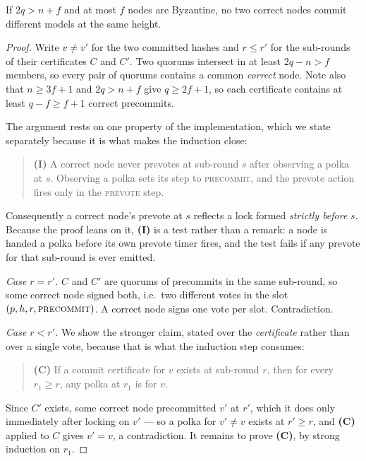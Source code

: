 \documentclass{llncs}
\begin{document}
\begin{proposition}[Agreement]
If $2q > n+f$ and at most $f$ nodes are Byzantine, no two correct nodes commit
different models at the same height.
\end{proposition}

\begin{proof}
Write $v \neq v'$ for the two committed hashes and $r \le r'$ for the sub-rounds
of their certificates $C$ and $C'$. Two quorums intersect in at least $2q - n >
f$ members, so every pair of quorums contains a common \emph{correct} node.
Note also that $n \ge 3f+1$ and $2q > n+f$ give $q \ge 2f+1$, so each certificate
contains at least $q - f \ge f+1$ correct precommits.

The argument rests on one property of the implementation, which we state
separately because it is what makes the induction close:

\begin{quote}
\textbf{(I)} A correct node never prevotes at sub-round $s$ after observing a
polka at $s$. Observing a polka sets its step to \textsc{precommit}, and the
prevote action fires only in the \textsc{prevote} step.
\end{quote}

Consequently a correct node's prevote at $s$ reflects a lock formed
\emph{strictly before} $s$. Because the proof leans on it, \textbf{(I)} is a
test rather than a remark: a node is handed a polka before its own prevote timer
fires, and the test fails if any prevote for that sub-round is ever emitted.

\medskip\noindent\emph{Case $r = r'$.} $C$ and $C'$ are quorums of precommits in
the same sub-round, so some correct node signed both, i.e.\ two different votes
in the slot $(p, h, r, \textsc{precommit})$. A correct node signs one vote per
slot. Contradiction.

\medskip\noindent\emph{Case $r < r'$.} We show the stronger claim, stated over
the \emph{certificate} rather than over a single vote, because that is what the
induction step consumes:

\begin{quote}
\textbf{(C)} If a commit certificate for $v$ exists at sub-round $r$, then for
every $r_1 \ge r$, any polka at $r_1$ is for $v$.
\end{quote}

Since $C'$ exists, some correct node precommitted $v'$ at $r'$, which it does
only immediately after locking on $v'$ --- so a polka for $v' \neq v$ exists at
$r' \ge r$, and \textbf{(C)} applied to $C$ gives $v' = v$, a contradiction. It
remains to prove \textbf{(C)}, by strong induction on $r_1$.


\end{proof}
\end{document}
